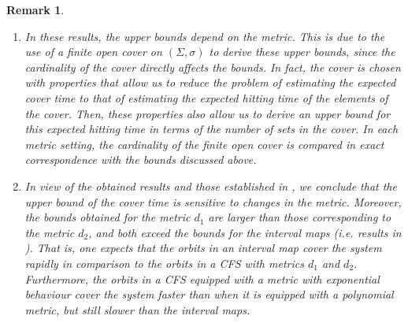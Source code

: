 \documentclass[11pt, reqno]{amsart}
\theoremstyle{plain}%
\newtheorem{theorem}{Theorem}[section]
\newtheorem{remark}[theorem]{Remark}
\theoremstyle{definition}
\theoremstyle{definition}
\def\R{\ensuremath{\mathbb R}}
\def\E{\mathbb E}
\def\st{such that }
\numberwithin{equation}{section}
\begin{document}
\begin{remark}\label{Remark: Conclusion after Main Thm}
\begin{enumerate}
    \item In these results, the upper bounds depend on the metric. This is due to the use of a finite open cover on $(\Sigma,\sigma)$ to derive these upper bounds, since the cardinality of the cover directly affects the bounds. In fact, the cover is chosen with properties that allow us to reduce the problem of estimating the expected cover time to that of estimating the expected hitting time of the elements of the cover. Then, these properties also allow us to derive an upper bound for this expected hitting time in terms of the number of sets in the cover. In each metric setting, the cardinality of the finite open cover is compared in exact correspondence with the bounds discussed above.
    \item In view of the obtained results and those established in \cite{MikeNatali}, we conclude that the upper bound of the cover time is sensitive to changes in the metric. Moreover, the bounds obtained for the metric $d_1$ are larger than those corresponding to the metric $d_2$, and both exceed the bounds for the interval maps (i.e. results in \cite{MikeNatali}). That is, one expects that the orbits in an interval map cover the system rapidly in comparison to the orbits in a CFS with metrics $d_1$ and $d_2$. Furthermore, the orbits in a CFS equipped with a metric with exponential behaviour cover the system faster than when it is equipped with a polynomial metric, but still slower than the interval maps.
\end{enumerate}

\end{remark}
\end{document}
